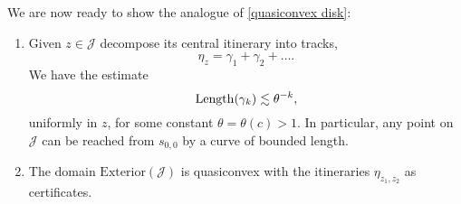 We are now ready to show the analogue of \cref{quasiconvex disk}:
\begin{theorem}  \leavevmode
\begin{enumerate}[label=\normalfont(\roman*)]

\item Given $z\in\mathcal{J}$ decompose its central itinerary into tracks, 
\begin{equation*}
\eta_z = \gamma _1 +\gamma_2 +\dots.
\end{equation*}
We have the estimate
\begin{equation*}
\operatorname{Length}(\gamma_{k})\lesssim\theta^{-k},
\end{equation*}
uniformly in $z$, for some constant $\theta=\theta(c)>1$. In particular, any point on \(\mathcal{J}\) can be reached from $s_{0,0}$ by a curve of bounded length.

\item The domain $\mathrm{Exterior}(\mathcal{J})$ is quasiconvex with the itineraries $\eta_{z_1,z_2}$ as certificates.
	\end{enumerate}
\end{theorem}

